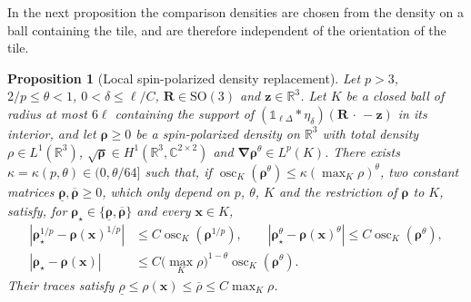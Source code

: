 \documentclass[final,reqno]{amsart}
\newtheorem{proposition}[theorem]{Proposition}
\theoremstyle{remark}
\renewcommand{\le}{\leqslant}
\renewcommand{\ge}{\geqslant}
\newcommand{\ol}[1]{\overline{#1}}
\newcommand{\ul}[1]{\underline{#1}}
\newcommand{\RR}{\mathbb{R}}
\newcommand{\CC}{\mathbb{C}}
\newcommand{\SO}{\mathrm{SO}}
\newcommand{\iden}{\mathbb{1}}
\newcommand{\grad}{\bm{\nabla}}
\newcommand{\tetra}{\mathbb{\Delta}}
\begin{document}
In the next proposition the comparison densities are chosen from the density on a ball containing the tile, and are therefore independent of the orientation of the tile.

\begin{proposition}[Local spin-polarized density replacement]\label{prop:replace_spiral}
Let $p>3$, $2/p\le\theta<1$, $0<\delta\le\ell/C$, $\mathbf{R}\in\SO(3)$ and $\mathbf{z}\in\RR^3$. Let $K$ be a closed ball of radius at most $6\ell$ containing the support of $(\iden_{\ell\tetra}\ast\eta_\delta)(\mathbf{R}\,\cdot\,-\mathbf{z})$ in its interior, and let $\bm{\rho}\ge0$ be a spin-polarized density on $\RR^3$ with total density $\rho\in L^1(\RR^3)$, $\sqrt{\bm{\rho}}\in H^1(\RR^3,\CC^{2\times2})$ and $\grad\bm{\rho}^\theta\in L^p(K)$. There exists $\kappa=\kappa(p,\theta)\in(0,\theta/64]$ such that, if $\operatorname{osc}_K(\bm{\rho}^\theta)\le\kappa(\max_K\rho)^\theta$, two constant matrices $\ul{\bm{\rho}},\ol{\bm{\rho}}\ge0$, which only depend on $p$, $\theta$, $K$ and the restriction of $\bm{\rho}$ to $K$, satisfy, for $\bm{\rho}_\star\in\{\ul{\bm{\rho}},\ol{\bm{\rho}}\}$ and every $\mathbf{x}\in K$,
\begin{equation}\label{eq:spiral_comparison_rotation}
\begin{aligned}
|\bm{\rho}_\star^{1/p}-\bm{\rho}(\mathbf{x})^{1/p}|&\le C\operatorname{osc}_K(\bm{\rho}^{1/p}),\qquad
|\bm{\rho}_\star^\theta-\bm{\rho}(\mathbf{x})^\theta|\le C\operatorname{osc}_K(\bm{\rho}^\theta),\\
|\bm{\rho}_\star-\bm{\rho}(\mathbf{x})|&\le C\Big(\max_K\rho\Big)^{1-\theta}\operatorname{osc}_K(\bm{\rho}^\theta).
\end{aligned}
\end{equation}
Their traces satisfy $\ul{\rho}\le\rho(\mathbf{x})\le\ol{\rho}\le C\max_K\rho$.


\end{proposition}
\end{document}
